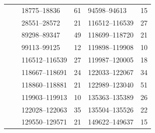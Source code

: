 \begin{table}[ht]
\begin{tabular}{ll|ll|ll}
													 &                                               & 18775--18836                                 & 61                                         & 94598--94613                                 & 15                                        \\
													 &                                               & 28551--28572                                 & 21                                         & 116512--116539                               & 27                                        \\
													 &                                               & 89298--89347                                 & 49                                         & 118699--118720                               & 21                                        \\
													 &                                               & 99113--99125                                 & 12                                         & 119898--119908                               & 10                                        \\
													 &                                               & 116512--116539                               & 27                                         & 119987--120005                               & 18                                        \\
													 &                                               & 118667--118691                               & 24                                         & 122033--122067                               & 34                                        \\
													 &                                               & 118860--118881                               & 21                                         & 122989--123040                               & 51                                        \\
													 &                                               & 119903--119913                               & 10                                         & 135363--135389                               & 26                                        \\
													 &                                               & 122028--122063                               & 35                                         & 135504--135526                               & 22                                        \\
													 &                                               & 129550--129571                               & 21                                         & 149622--149637                               & 15                                        \\

\end{tabular}
\end{table}
